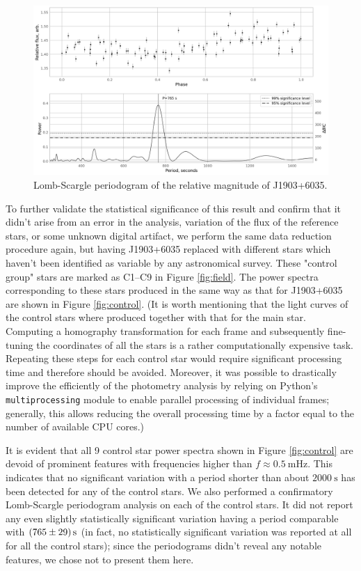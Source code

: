 \documentclass{aastex631}
\begin{document}
\begin{figure}[htbp]
\centering
\includegraphics[width=.9\linewidth]{./img/ls_periodogram.png}
\caption{\label{fig:lsp}Lomb-Scargle periodogram of the relative
  magnitude of J1903+6035.}
\end{figure}

To further validate the statistical significance of this result and
confirm that it didn't arise from an error in the analysis, variation
of the flux of the reference stars, or some unknown digital artifact,
we perform the same data reduction procedure again, but having
J1903+6035 replaced with different stars which haven't been identified
as variable by any astronomical survey. These "control group" stars
are marked as C1--C9 in Figure \ref{fig:field}. The power spectra
corresponding to these stars produced in the same way as that for
J1903+6035 are shown in Figure \ref{fig:control}. (It is worth
mentioning that the light curves of the control stars where produced
together with that for the main star. Computing a homography
transformation for each frame and subsequently fine-tuning the
coordinates of all the stars is a rather computationally expensive
task. Repeating these steps for each control star would require
significant processing time and therefore should be avoided. Moreover,
it was possible to drastically improve the efficiently of the
photometry analysis by relying on Python's \texttt{multiprocessing}
module to enable parallel processing of individual frames; generally,
this allows reducing the overall processing time by a factor equal to
the number of available CPU cores.)

It is evident that all 9 control star power spectra shown in Figure
\ref{fig:control} are devoid of prominent features with frequencies
higher than $f\approx\SI{0.5}{\mHz}$. This indicates that no
significant variation with a period shorter than about
$\SI{2000}{\second}$ has been detected for any of the control
stars. We also performed a confirmatory Lomb-Scargle periodogram
analysis on each of the control stars. It did not report any even
slightly statistically significant variation having a period
comparable with $\SI{765\pm 29}{\second}$ (in fact, no statistically
significant variation was reported at all for all the control stars);
since the periodograms didn't reveal any notable features, we chose
not to present them here.
\end{document}
